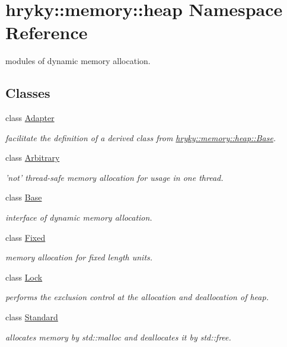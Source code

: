 \hypertarget{namespacehryky_1_1memory_1_1heap}{\section{hryky\-:\-:memory\-:\-:heap Namespace Reference}
\label{namespacehryky_1_1memory_1_1heap}
}


modules of dynamic memory allocation.  


\subsection*{Classes}
\begin{DoxyCompactItemize}
\item 
class \hyperlink{classhryky_1_1memory_1_1heap_1_1_adapter}{Adapter}
\begin{DoxyCompactList}\small\item\em facilitate the definition of a derived class from \hyperlink{classhryky_1_1memory_1_1heap_1_1_base}{hryky\-::memory\-::heap\-::\-Base}. \end{DoxyCompactList}\item 
class \hyperlink{classhryky_1_1memory_1_1heap_1_1_arbitrary}{Arbitrary}
\begin{DoxyCompactList}\small\item\em 'not' thread-\/safe memory allocation for usage in one thread. \end{DoxyCompactList}\item 
class \hyperlink{classhryky_1_1memory_1_1heap_1_1_base}{Base}
\begin{DoxyCompactList}\small\item\em interface of dynamic memory allocation. \end{DoxyCompactList}\item 
class \hyperlink{classhryky_1_1memory_1_1heap_1_1_fixed}{Fixed}
\begin{DoxyCompactList}\small\item\em memory allocation for fixed length units. \end{DoxyCompactList}\item 
class \hyperlink{classhryky_1_1memory_1_1heap_1_1_lock}{Lock}
\begin{DoxyCompactList}\small\item\em performs the exclusion control at the allocation and deallocation of heap. \end{DoxyCompactList}\item 
class \hyperlink{classhryky_1_1memory_1_1heap_1_1_standard}{Standard}
\begin{DoxyCompactList}\small\item\em allocates memory by std\-::malloc and deallocates it by std\-::free. \end{DoxyCompactList}\end{DoxyCompactItemize}
